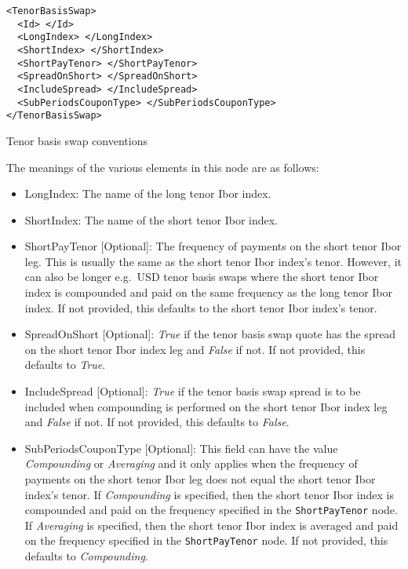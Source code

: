 \begin{listing}[H]
\begin{verbatim}
<TenorBasisSwap>
  <Id> </Id>
  <LongIndex> </LongIndex>
  <ShortIndex> </ShortIndex>
  <ShortPayTenor> </ShortPayTenor>
  <SpreadOnShort> </SpreadOnShort>
  <IncludeSpread> </IncludeSpread>
  <SubPeriodsCouponType> </SubPeriodsCouponType>
</TenorBasisSwap>
\end{verbatim}
\caption{Tenor basis swap conventions}
\label{lst:tenor_basis_conventions}
\end{listing}


The meanings of the various elements in this node are as follows:
\begin{itemize}
\item LongIndex: The name of the long tenor Ibor index.
\item ShortIndex: The name of the short tenor Ibor index.
\item ShortPayTenor [Optional]: The frequency of payments on the short tenor Ibor leg. This is usually the same as the
short tenor Ibor index's tenor. However, it can also be longer e.g.\ USD tenor basis swaps where the short tenor Ibor
index is compounded and paid on the same frequency as the long tenor Ibor index. If not provided, this defaults to the
short tenor Ibor index's tenor.
\item SpreadOnShort [Optional]: \emph{True} if the tenor basis swap quote has the spread on the short tenor Ibor index
leg and \emph{False} if not. If not provided, this defaults to \emph{True}.
\item IncludeSpread [Optional]: \emph{True} if the tenor basis swap spread is to be included when compounding is
performed on the short tenor Ibor index leg and \emph{False} if not. If not provided, this defaults to \emph{False}.
\item SubPeriodsCouponType [Optional]: This field can have the value \emph{Compounding} or \emph{Averaging} and it only
applies when the frequency of payments on the short tenor Ibor leg does not equal the short tenor Ibor index's tenor. If
\emph{Compounding} is specified, then the short tenor Ibor index is compounded and paid on the frequency specified in
the \lstinline!ShortPayTenor! node. If \emph{Averaging} is specified, then the short tenor Ibor index is averaged and
paid on the frequency specified in the \lstinline!ShortPayTenor! node. If not provided, this defaults to
\emph{Compounding}.
\end{itemize}

